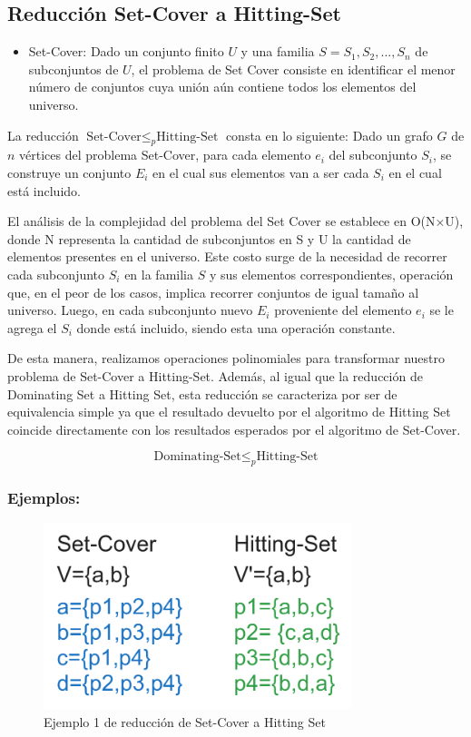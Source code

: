 \subsection{Reducción Set-Cover a Hitting-Set}

\begin{itemize}
    \item Set-Cover: Dado un conjunto finito $U$ y una familia $S= {S_1, S_2, ..., S_n}$ de subconjuntos de $U$, el problema de Set Cover consiste en identificar el menor número de conjuntos cuya unión aún contiene todos los elementos del universo. 
\end{itemize}

La reducción $\text{Set-Cover} \leq_{p} \text{Hitting-Set}$ consta en lo siguiente:
Dado un grafo $G$ de $n$ vértices del problema Set-Cover, para cada elemento $e_i$ del subconjunto $S_{i}$, se construye un conjunto $E_{i}$ en el cual sus elementos van a ser cada $S_i$ en el cual está incluido. 

El análisis de la complejidad del problema del Set Cover se establece en O(N×U), donde N representa la cantidad de subconjuntos en S y U la cantidad de elementos presentes en el universo. Este costo surge de la necesidad de recorrer cada subconjunto $S_i$ en la familia $S$ y sus elementos correspondientes, operación que, en el peor de los casos, implica recorrer conjuntos de igual tamaño al universo. Luego, en cada subconjunto nuevo $E_i$ proveniente del elemento $e_i$ se le agrega el $S_i$ donde está incluido, siendo esta una operación constante. 

De esta manera, realizamos operaciones polinomiales para transformar nuestro problema de Set-Cover a Hitting-Set. Además, al igual que la reducción de Dominating Set a Hitting Set, esta reducción se caracteriza por ser de equivalencia simple ya que el resultado devuelto por el algoritmo de Hitting Set coincide directamente con los resultados esperados por el algoritmo de Set-Cover.


\[\text{Dominating-Set}  \leq _{p} \text{Hitting-Set}\]

\subsubsection{Ejemplos:} 

\begin{figure}[H]
    \centering
    \includegraphics[width=0.8\textwidth]{img/ejemplo1_SC-HS.png}
    \caption{Ejemplo 1 de reducción de Set-Cover a Hitting Set}
    \label{fig:ejemplo1_DS-HS}
\end{figure}


